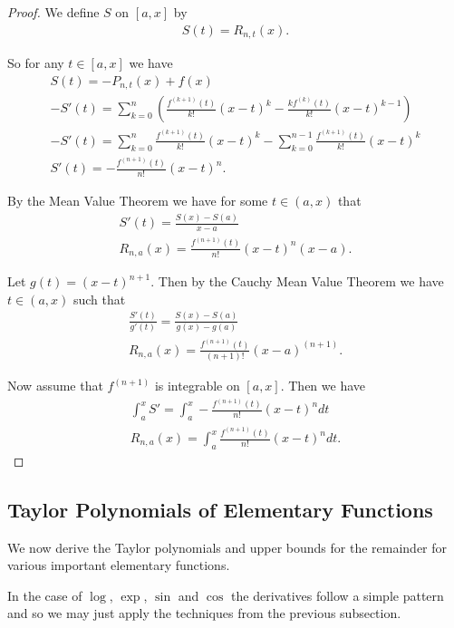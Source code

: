 \documentclass[]{article}
\begin{document}
\begin{proof}
		We define $S$ on $[a,x]$ by 
		\begin{align*}
				S(t) = R_{n,t}(x).
		\end{align*}

		So for any $t \in [a,x]$ we have
		\begin{align*}
				S(t) = -P_{n,t}(x) + f(x) \\
				-S'(t) = \sum_{k=0}^n \left(\frac{f^{(k+1)}(t)}{k!}(x-t)^k - \frac{kf^{(k)}(t)}{k!}(x-t)^{k-1}\right) \\
		-S'(t) = \sum_{k=0}^n \frac{f^{(k+1)}(t)}{k!}(x-t)^k - \sum_{k=0}^{n-1} \frac{f^{(k+1)}(t)}{k!}(x-t)^k \\
		S'(t) = -\frac{f^{(n+1)}(t)}{n!}(x-t)^n.
		\end{align*}

		By the Mean Value Theorem we have for some $t \in (a,x)$ that
		\begin{align*}
				S'(t) = \frac{S(x) - S(a)}{x-a} \\
				R_{n,a}(x) = \frac{f^{(n+1)}(t)}{n!}(x-t)^n(x-a).
		\end{align*}

		Let $g(t) = (x-t)^{n+1}$. Then by the Cauchy Mean Value Theorem we have $t \in (a,x)$ such that
		 \begin{align*}
				 \frac{S'(t)}{g'(t)} = \frac{S(x) - S(a)}{g(x)-g(a)} \\
				 R_{n,a}(x) = \frac{f^{(n+1)}(t)}{(n+1)!} (x-a)^{(n+1)}.
		\end{align*}

		Now assume that $f^{(n+1)}$ is integrable on $[a,x]$. Then we have
		\begin{align*}
				\int_a^x S' = \int_a^x -\frac{f^{(n+1)}(t)}{n!} (x-t)^n dt \\
				R_{n,a}(x) = \int_a^x \frac{f^{(n+1)}(t)}{n!}(x-t)^n dt.
		\end{align*}
\end{proof}

\subsection{Taylor Polynomials of Elementary Functions}

We now derive the Taylor polynomials and upper bounds for the remainder for various important elementary functions. 

In the case of $\log$, $\exp$, $\sin$ and $\cos$ the derivatives follow a simple pattern and so we may just apply the techniques from the previous subsection. 
\end{document}
